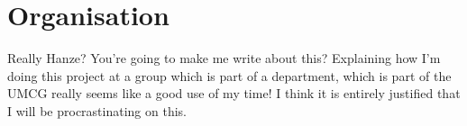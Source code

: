 \chapter*{Organisation}

Really Hanze? You're going to make me write about this?
Explaining how I'm doing this project at a group which is part of a department, which is part of the UMCG really seems like a good use of my time!
I think it is entirely justified that I will be procrastinating on this.
